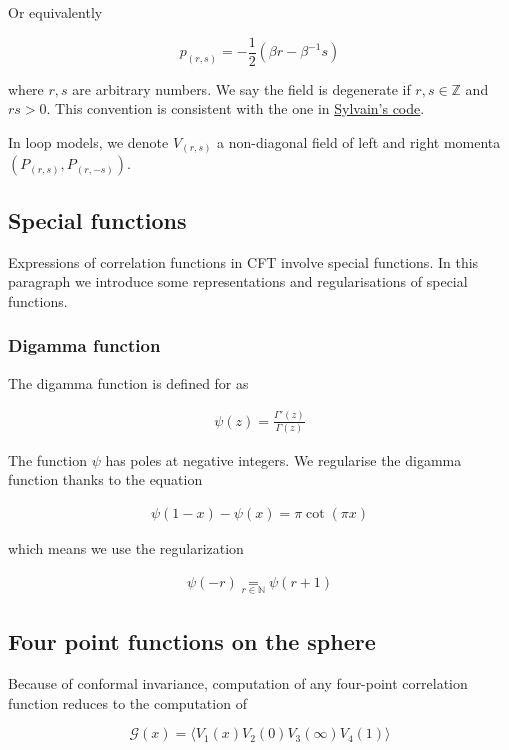 \documentclass[a4paper]{article}
\numberwithin{equation}{section}
\begin{document}
Or equivalently

\[p_{(r,s)} = -\frac{1}{2} (\beta r - \beta^{-1}s)\]

where \(r,s\) are arbitrary numbers. We say the field is degenerate if \(r,s\in \mathbb Z\) and \(rs > 0\).
This convention is consistent with the one in \href{https://gitlab.com/s.g.ribault/Bootstrap\_Virasoro.git}{Sylvain's code}.

In loop models, we denote \(V_{(r,s)}\) a non-diagonal field of left and right momenta \((P_{(r,s)},P_{(r,-s)})\).
\subsection{Special functions}
\label{sec:org2c78d31}

Expressions of correlation functions in CFT involve special functions. In this paragraph we introduce some representations and regularisations of special functions.
\subsubsection*{Digamma function}
\label{sec:org8a83eb3}

The digamma function is defined for as

\begin{align}
  \psi(z) = \frac{\Gamma'(z)}{\Gamma(z)}
\end{align}

The function \(\psi\) has poles at negative integers. We regularise the digamma function thanks to the equation

\begin{align}
  \psi(1-x) - \psi(x) = \pi \operatorname{cot}(\pi x)
\end{align}

which means we use the regularization

\begin{align}
  \psi(-r) \underset{r\in\mathbb{N}}{=} \psi(r+1)
\end{align}
\subsection{Four point functions on the sphere}
\label{sec:org9b5e4a5}

Because of conformal invariance, computation of any four-point correlation function reduces to the computation of

$$ \mathcal G(x) = \langle V_{1}(x) V_{2}(0) V_{3}(\infty) V_{4}(1) \rangle $$
\end{document}
